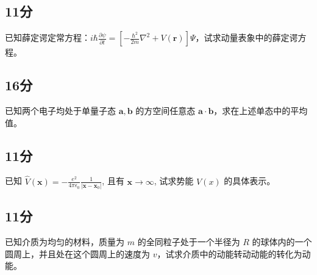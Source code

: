 \subsection{11分}
已知薛定谔定常方程：$i\hbar \frac{\partial \psi}{\partial t} = \left[ -\frac{\hbar^2}{2m} \nabla^2 + V(\mathbf{r}) \right] \Psi$，试求动量表象中的薛定谔方程。

\subsection{16分}
已知两个电子均处于单量子态 $\mathbf{a}, \mathbf{b}$ 的方空间任意态 $\mathbf{a} \cdot \mathbf{b}$，求在上述单态中的平均值。

\subsection{11分}
已知 $\hat{V}(\mathbf{x}) = -\frac{e^2}{4 \pi \epsilon_0} \frac{1}{|\mathbf{x} - \mathbf{x}_0|}$, 且有 $\mathbf{x} \rightarrow \infty$, 试求势能 $V(x)$ 的具体表示。

\subsection{11分}
已知介质为均匀的材料，质量为 $m$ 的全同粒子处于一个半径为 $R$ 的球体内的一个圆周上，并且处在这个圆周上的速度为 $v$，试求介质中的动能转动动能的转化为动能。

